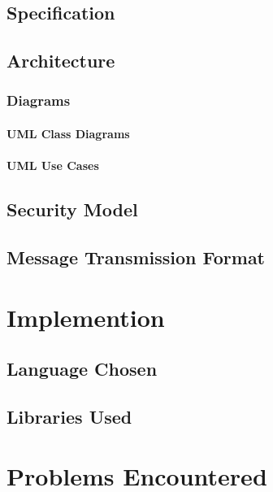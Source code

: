 \documentclass[a4paper,12pt]{article}
\begin{document}
\section{Specification}

\section{Architecture}

\subsection{Diagrams}

\subsubsection{UML Class Diagrams}

\subsubsection{UML Use Cases}

\section{Security Model}

\section{Message Transmission Format}

\pagebreak


\chapter{Implemention}

\section{Language Chosen}

\section{Libraries Used}

\pagebreak


\chapter{Problems Encountered}
\end{document}

